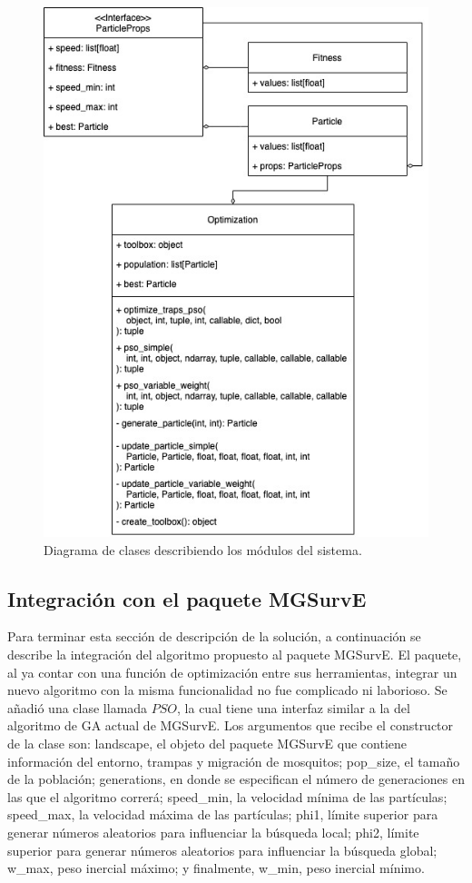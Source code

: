  \begin{figure}[ht!]
    \includegraphics[width=\textwidth]{optimization-modules.jpeg}
    \caption{Diagrama de clases describiendo los módulos del sistema.}
    \label{fig:optimization-modules}
  \end{figure}

  \subsection{Integración con el paquete MGSurvE}

  Para terminar esta sección de descripción de la solución, a continuación se
  describe la integración del algoritmo propuesto al paquete MGSurvE. El
  paquete, al ya contar con una función de optimización entre sus
  herramientas, integrar un nuevo algoritmo con la misma funcionalidad no fue
  complicado ni laborioso. Se añadió una clase llamada $PSO$, la cual tiene
  una interfaz similar a la del algoritmo de GA actual de MGSurvE. Los
  argumentos que recibe el constructor de la clase son: landscape, el objeto
  del paquete MGSurvE que contiene información del entorno, trampas y
  migración de mosquitos; pop\_size, el tamaño de la población; generations,
  en donde se especifican el número de generaciones en las que el algoritmo
  correrá; speed\_min, la velocidad mínima de las partículas; speed\_max, la
  velocidad máxima de las partículas; phi1, límite superior para generar
  números aleatorios para influenciar la búsqueda local; phi2, límite superior
  para generar números aleatorios para influenciar la búsqueda global; w\_max,
  peso inercial máximo; y finalmente, w\_min, peso inercial mínimo.
  
